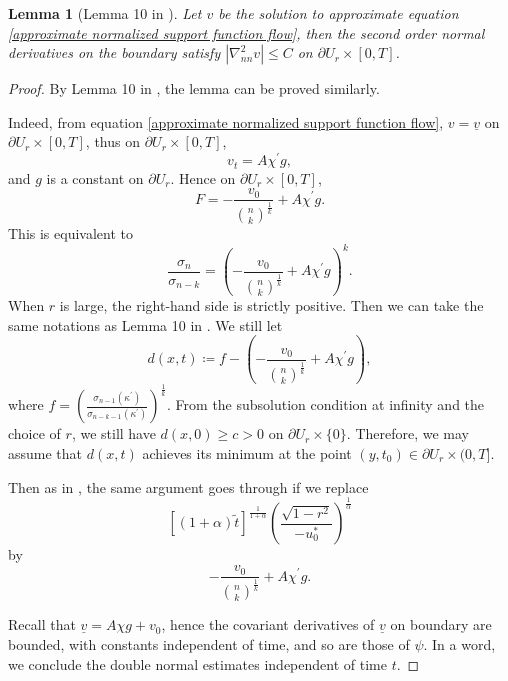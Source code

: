 \documentclass[reqno]{amsart}
\newtheorem{lemma}[theorem]{Lemma}
\theoremstyle{remark}
\theoremstyle{definition}
\numberwithin{equation}{section}
\begin{document}
\begin{lemma}[Lemma 10 in \cite{Entiresigmakcurvatureflow}]
    Let $v$ be the solution to approximate equation \eqref{approximate normalized support function flow}, then the second order normal derivatives on the boundary satisfy $|\nabla^2_{nn} v| \leqslant C$ on $\partial U_r \times [0, T]$.
\end{lemma}
\begin{proof}
    By Lemma 10 in \cite{Entiresigmakcurvatureflow}, the lemma can be proved similarly.
    
    Indeed, from equation \eqref{approximate normalized support function flow}, $v = \underline{v}$ on $\partial U_r \times [0, T]$, thus on $\partial U_r \times [0, T]$,
    \[
    v_t = A\chi^{\prime}g,
    \]
    and $g$ is a constant on $\partial U_r$. Hence on $\partial U_r \times [0, T]$,
    \[
    F = -\frac{v_0}{\binom{n}{k}^{\frac{1}{k}}} + A\chi^{\prime}g.
    \]
    This is equivalent to
    \[
    \frac{\sigma_n}{\sigma_{n-k}} = \left( -\frac{v_0}{\binom{n}{k}^{\frac{1}{k}}} + A\chi^{\prime}g \right)^k.
    \]
    When $r$ is large, the right-hand side is strictly positive. Then we can take the same notations as Lemma 10 in \cite{Entiresigmakcurvatureflow}. We still let
    \[
    d(x, t) \coloneqq f - \left( -\frac{v_0}{\binom{n}{k}^{\frac{1}{k}}} + A\chi^{\prime}g \right),
    \]
    where $f = \left( \frac{\sigma_{n-1}(\kappa^{\prime})}{\sigma_{n-k-1}(\kappa^{\prime})} \right)^{\frac{1}{k}}$.
    From the subsolution condition at infinity and the choice of $r$, we still have $d(x, 0) \geqslant c > 0$ on $\partial U_r \times \{0\}$.
    Therefore, we may assume that $d(x, t)$ achieves its minimum at the point $(y, t_0) \in \partial U_r \times (0, T]$. 
    
    Then as in \cite{Entiresigmakcurvatureflow}, the same argument goes through if we replace 
    \[[(1+\alpha)\tilde{t}]^{\frac{1}{1+\alpha}} \left( \frac{\sqrt{1-r^2}}{-u_0^*} \right)^{\frac{1}{\alpha}}\] 
    by
    \[ -\frac{v_0}{\binom{n}{k}^{\frac{1}{k}}} + A\chi^{\prime}g. \]

    Recall that $\underline{v} = A\chi g + v_0$, hence the covariant derivatives of $\underline{v}$ on boundary are bounded, with constants independent of time, and so are those of $\psi$. In a word, we conclude the double normal estimates independent of time $t$.
\end{proof}
\end{document}
